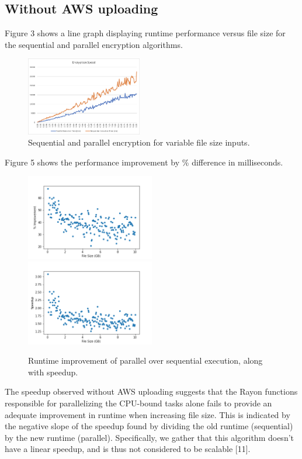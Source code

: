 \documentclass[conference]{IEEEtran}
\begin{document}
\subsection{Without AWS uploading}
Figure 3 shows a line graph displaying runtime performance versus file size for the sequential and parallel encryption
algorithms.

\begin{figure}[h]
	\caption{Sequential and parallel encryption for variable file size inputs.}
	\centering
	\includegraphics[width=0.45\textwidth]{encryption-speed-line.png}
\end{figure}

Figure 5 shows the performance improvement by \% difference in milliseconds.

\begin{figure}[h]
	\caption{Runtime improvement of parallel over sequential execution, along with speedup.}
	\centering
	\includegraphics[width=0.50\textwidth]{execution-improvement.png}
	\includegraphics[width=0.50\textwidth]{execution-speedup.png}
\end{figure}

The speedup observed without AWS uploading suggests that the Rayon functions responsible for parallelizing
the CPU-bound tasks alone fails to provide an adequate improvement in runtime when increasing file size. This is 
indicated by the negative slope of the speedup found by dividing the old runtime (sequential) by the new runtime (parallel).
Specifically, we gather that this algorithm doesn't have a linear speedup, and is thus not considered to be scalable [11].
\end{document}
